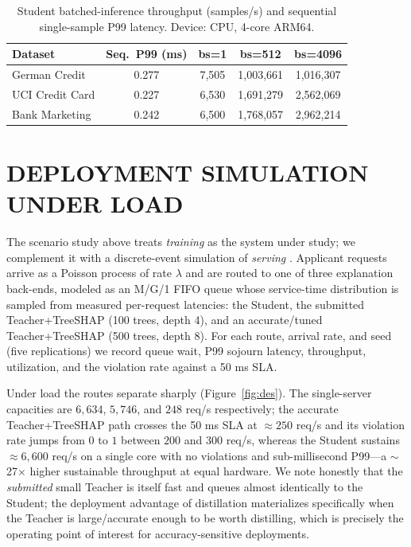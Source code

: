 \documentclass{wscpaperproc}
\theoremstyle{wsc}
\begin{document}
\begin{table}[htb]
\centering
\caption{Student batched-inference throughput (samples/s) and sequential single-sample P99 latency. Device: CPU, 4-core ARM64.}
\label{tab:throughput}
\footnotesize
\begin{tabular}{lcccc}
\hline
Dataset & Seq.\ P99 (ms) & bs=1 & bs=512 & bs=4096 \\ \hline
German Credit   & 0.277 & 7,505 & 1,003,661 & 1,016,307 \\
UCI Credit Card & 0.227 & 6,530 & 1,691,279 & 2,562,069 \\
Bank Marketing  & 0.242 & 6,500 & 1,768,057 & 2,962,214 \\ \hline
\end{tabular}
\end{table}

\section{DEPLOYMENT SIMULATION UNDER LOAD}
\label{sec:deployment}
The scenario study above treats \emph{training} as the system under study; we complement it with a discrete-event simulation of \emph{serving} \cite{bcnn:simulation}. Applicant requests arrive as a Poisson process of rate $\lambda$ and are routed to one of three explanation back-ends, modeled as an M/G/1 FIFO queue whose service-time distribution is sampled from measured per-request latencies: the Student, the submitted Teacher+TreeSHAP (100 trees, depth 4), and an accurate/tuned Teacher+TreeSHAP (500 trees, depth 8). For each route, arrival rate, and seed (five replications) we record queue wait, P99 sojourn latency, throughput, utilization, and the violation rate against a 50 ms SLA.

Under load the routes separate sharply (Figure~\ref{fig:des}). The single-server capacities are $6{,}634$, $5{,}746$, and $248$ req/s respectively; the accurate Teacher+TreeSHAP path crosses the 50 ms SLA at $\approx250$ req/s and its violation rate jumps from $0$ to $1$ between $200$ and $300$ req/s, whereas the Student sustains $\approx6{,}600$ req/s on a single core with no violations and sub-millisecond P99---a $\sim$27$\times$ higher sustainable throughput at equal hardware. We note honestly that the \emph{submitted} small Teacher is itself fast and queues almost identically to the Student; the deployment advantage of distillation materializes specifically when the Teacher is large/accurate enough to be worth distilling, which is precisely the operating point of interest for accuracy-sensitive deployments.
\end{document}
